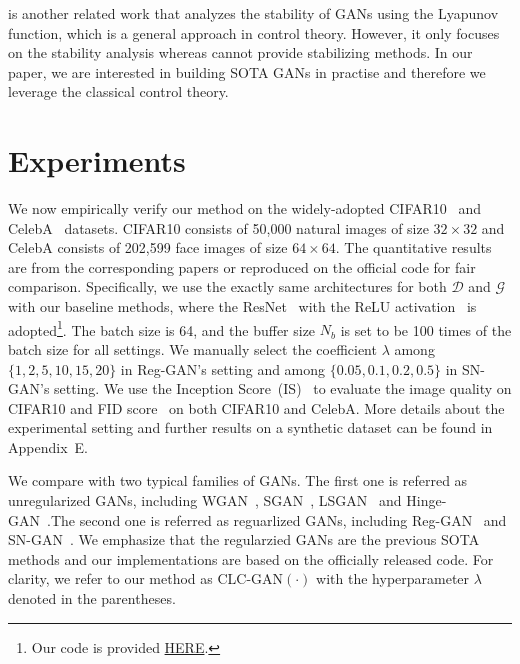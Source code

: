 \documentclass{article}
\newcommand{\xG}{\mathcal{G}}
\newcommand{\xD}{\mathcal{D}}
\theoremstyle{definition}
\begin{document}
\citet{feizi2017understanding} is another related work that analyzes the stability of GANs using the Lyapunov function, which is a general approach in control theory. However, it only focuses on the stability analysis whereas cannot provide stabilizing methods. In our paper, we are interested in building SOTA GANs in practise and therefore we leverage the classical control theory.





\section{Experiments}\label{sec:experiment}


We now empirically verify our method on the widely-adopted CIFAR10~\citep{krizhevsky2009learning} and CelebA~\citep{liu2015faceattributes} datasets. 
CIFAR10 consists of 50,000 natural images of size $32\times 32$ and CelebA consists of 202,599 face images of size $64\times 64$.
The quantitative results are from the corresponding papers or reproduced on the official code for fair comparison.
Specifically, we use the exactly same architectures for both $\xD$ and $\xG$ with our baseline methods, where the ResNet~\citep{he2016deep} with the ReLU activation~\citep{glorot2011deep} is adopted\footnote{Our code is provided \href{https://github.com/taufikxu/GAN_PID}{HERE}.}.
The batch size is 64, and the buffer size $N_b$ is set to be 100 times of the batch size for all settings. 
We manually select the coefficient $\lambda$ among $\{1, 2, 5, 10, 15, 20\}$ in Reg-GAN's setting and among $\{0.05, 0.1, 0.2, 0.5\}$ in SN-GAN's setting.
We use the Inception Score~(IS)~\citep{salimans2016improved} to evaluate the image quality on CIFAR10 and FID score~\citep{gulrajani2017improved} on both CIFAR10 and CelebA. 
More details about the experimental setting and further results on a synthetic dataset can be found in Appendix~E. 


We compare with two typical families of GANs. The first one is referred as unregularized GANs, including WGAN~\cite{arjovsky2017wasserstein}, SGAN~\cite{goodfellow2014generative}, LSGAN~\cite{mao2017least} and Hinge-GAN~\cite{miyato2018spectral}.The second one is referred as reguarlized GANs, including Reg-GAN~\cite{mescheder2018training} and SN-GAN~\cite{miyato2018spectral}.
We emphasize that the regularzied GANs are the previous SOTA methods and our implementations are based on the officially released code. 
For clarity, we refer to our method as CLC-GAN$(\cdot)$ with the hyperparameter $\lambda$ denoted in the parentheses.
\end{document}

